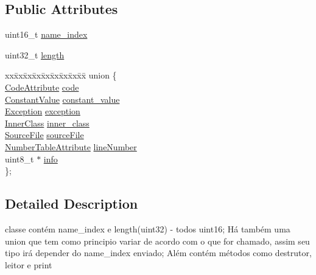 \subsection*{Public Attributes}
\begin{DoxyCompactItemize}
\item 
uint16\+\_\+t \hyperlink{class_attribute_info_a149c8bb83a448635fe1deb8d898c6efa}{name\+\_\+index}
\item 
uint32\+\_\+t \hyperlink{class_attribute_info_af2a071761e7f62eb240affb425c56896}{length}
\item 
\begin{tabbing}
xx\=xx\=xx\=xx\=xx\=xx\=xx\=xx\=xx\=\kill
union \{\\
\>\hyperlink{class_code_attribute}{CodeAttribute} \hyperlink{class_attribute_info_a8402afa8032becfaf9feeb3ac48fd503}{code}\\
\>\hyperlink{class_constant_value}{ConstantValue} \hyperlink{class_attribute_info_a250a7f39bbb2a2589dbf7bcdcf58639a}{constant\_value}\\
\>\hyperlink{class_exception}{Exception} \hyperlink{class_attribute_info_a72e793558ac34051d73771f94591c089}{exception}\\
\>\hyperlink{class_inner_class}{InnerClass} \hyperlink{class_attribute_info_aad26002c8512e7193a0963d21a20a7c4}{inner\_class}\\
\>\hyperlink{class_source_file}{SourceFile} \hyperlink{class_attribute_info_afcfcce1e1e4ea2a3461a00dd724847ac}{sourceFile}\\
\>\hyperlink{class_number_table_attribute}{NumberTableAttribute} \hyperlink{class_attribute_info_ac3d14ba1f8476677e0e48b856c678320}{lineNumber}\\
\>uint8\_t $\ast$ \hyperlink{class_attribute_info_a29031abd0ae7fd3a55950616e5368dd2}{info}\\
\}; \\

\end{tabbing}\end{DoxyCompactItemize}


\subsection{Detailed Description}
classe contém name\+\_\+index e length(uint32) -\/ todos uint16; Há também uma union que tem como principio variar de acordo com o que for chamado, assim seu tipo irá depender do name\+\_\+index enviado; Além contém métodos como destrutor, leitor e print 

